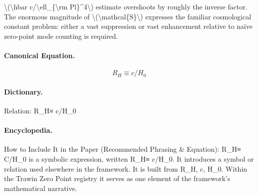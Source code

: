 \textbackslash{}(\textbackslash{}hbar c/\textbackslash{}ell\_\{\textbackslash{}rm Pl\}\textasciicircum{}4\textbackslash{}) estimate overshoots by roughly the inverse factor. The enormous magnitude of \textbackslash{}(\textbackslash{}mathcal\{S\}\textbackslash{}) expresses the familiar cosmological constant problem: either a vast suppression or vast enhancement relative to naïve zero-point mode counting is required.

\paragraph{Canonical Equation.}
\[
R_H\equiv c/H_0
\]

\paragraph{Dictionary.}
Relation: R\_H≡ c/H\_0

\paragraph{Encyclopedia.}
How to Include It in the Paper (Recommended Phrasing \& Equation): R\_H≡ C/H\_0 is a symbolic expression, written R\_H≡ c/H\_0. It introduces a symbol or relation used elsewhere in the framework. It is built from R\_H, c, H\_0. Within the Trawin Zero Point registry it serves as one element of the framework's mathematical narrative.
